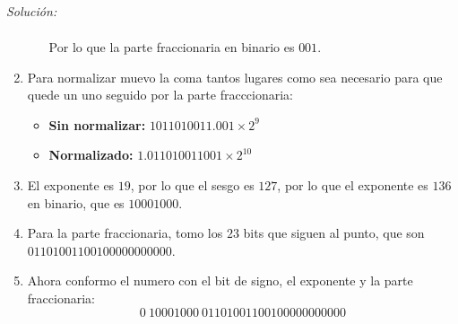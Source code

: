 \documentclass{article}
\newenvironment{solution}
    {\textit{Solución:}}
    {}
\begin{document}
\begin{solution}
\begin{enumerate}
\begin{itemize}
\begin{align*}
        \end{align*}
        Por lo que la parte fraccionaria en binario es $001$.
    \end{itemize}
    \item Para normalizar muevo la coma tantos lugares como sea necesario para que quede un uno seguido por la parte fracccionaria:
        \begin{itemize}
            \item \textbf{Sin normalizar:} $1011010011.001 \times 2^9$
            \item \textbf{Normalizado:} $1.011010011001 \times 2^{10}$
        \end{itemize}
    \item El exponente es $19$, por lo que el sesgo es $127$, por lo que el exponente es $136$ en binario, que es $10001000$.
    \item Para la parte fraccionaria, tomo los $23$ bits que siguen al punto, que son $01101001100100000000000$.
    \item Ahora conformo el numero con el bit de signo, el exponente y la parte fraccionaria:
    \begin{equation*}
        0 \ 10001000 \ 01101001100100000000000
    \end{equation*}
\end{enumerate}


\end{solution}
\end{document}

